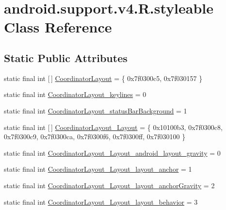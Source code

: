 \hypertarget{classandroid_1_1support_1_1v4_1_1_r_1_1styleable}{}\section{android.\+support.\+v4.\+R.\+styleable Class Reference}
\label{classandroid_1_1support_1_1v4_1_1_r_1_1styleable}
\subsection*{Static Public Attributes}
\begin{DoxyCompactItemize}
\item 
static final int \mbox{[}$\,$\mbox{]} \mbox{\hyperlink{classandroid_1_1support_1_1v4_1_1_r_1_1styleable_a94a213ce8a987dc40a09f872e7b309c5}{Coordinator\+Layout}} = \{ 0x7f0300c5, 0x7f030157 \}
\item 
static final int \mbox{\hyperlink{classandroid_1_1support_1_1v4_1_1_r_1_1styleable_ac459c15fb2b94718bc432f61c8ef84a4}{Coordinator\+Layout\+\_\+keylines}} = 0
\item 
static final int \mbox{\hyperlink{classandroid_1_1support_1_1v4_1_1_r_1_1styleable_a6a1da8ebca8b448fcdd32ead8be36d96}{Coordinator\+Layout\+\_\+status\+Bar\+Background}} = 1
\item 
static final int \mbox{[}$\,$\mbox{]} \mbox{\hyperlink{classandroid_1_1support_1_1v4_1_1_r_1_1styleable_a24dae251ce70776e4e34d952af255cd7}{Coordinator\+Layout\+\_\+\+Layout}} = \{ 0x10100b3, 0x7f0300c8, 0x7f0300c9, 0x7f0300ca, 0x7f0300f6, 0x7f0300ff, 0x7f030100 \}
\item 
static final int \mbox{\hyperlink{classandroid_1_1support_1_1v4_1_1_r_1_1styleable_a2c98d8fd8336f0e7ee85961528966322}{Coordinator\+Layout\+\_\+\+Layout\+\_\+android\+\_\+layout\+\_\+gravity}} = 0
\item 
static final int \mbox{\hyperlink{classandroid_1_1support_1_1v4_1_1_r_1_1styleable_a3174d1deef27e5011f260b4c0e9dd68c}{Coordinator\+Layout\+\_\+\+Layout\+\_\+layout\+\_\+anchor}} = 1
\item 
static final int \mbox{\hyperlink{classandroid_1_1support_1_1v4_1_1_r_1_1styleable_a6ac15c1d2a23c04603db960bcf8a9c33}{Coordinator\+Layout\+\_\+\+Layout\+\_\+layout\+\_\+anchor\+Gravity}} = 2
\item 
static final int \mbox{\hyperlink{classandroid_1_1support_1_1v4_1_1_r_1_1styleable_add5b47e18b903c79a9de8fcaae158465}{Coordinator\+Layout\+\_\+\+Layout\+\_\+layout\+\_\+behavior}} = 3

\end{DoxyCompactItemize}
